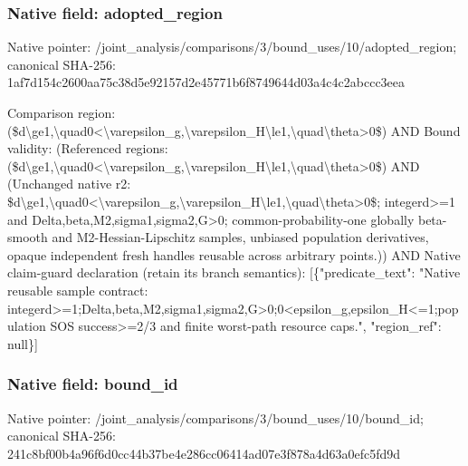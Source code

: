 \documentclass[10pt,a4paper]{article}
\begin{document}
\subsubsection{Native field: adopted\_\allowbreak{}region}
Native pointer: /joint\_\allowbreak{}analysis/comparisons/3/bound\_\allowbreak{}uses/10/adopted\_\allowbreak{}region; canonical SHA-256: 1af7d154c2600aa75c38d5e92157d2e45771b6f8749644d03a4c4c2abccc3eea

\begingroup\raggedright\sloppy Comparison region:\allowbreak{} (\$d\textbackslash{}ge1,\allowbreak{}\textbackslash{}quad0<\textbackslash{}varepsilon\_\allowbreak{}g,\allowbreak{}\textbackslash{}varepsilon\_\allowbreak{}H\textbackslash{}le1,\allowbreak{}\textbackslash{}quad\textbackslash{}theta>0\$) AND Bound validity:\allowbreak{} (Referenced regions:\allowbreak{} (\$d\textbackslash{}ge1,\allowbreak{}\textbackslash{}quad0<\textbackslash{}varepsilon\_\allowbreak{}g,\allowbreak{}\textbackslash{}varepsilon\_\allowbreak{}H\textbackslash{}le1,\allowbreak{}\textbackslash{}quad\textbackslash{}theta>0\$) AND (Unchanged native r2:\allowbreak{} \$d\textbackslash{}ge1,\allowbreak{}\textbackslash{}quad0<\textbackslash{}varepsilon\_\allowbreak{}g,\allowbreak{}\textbackslash{}varepsilon\_\allowbreak{}H\textbackslash{}le1,\allowbreak{}\textbackslash{}quad\textbackslash{}theta>0\$;\allowbreak{} integerd>=\allowbreak{}1 and Delta,\allowbreak{}beta,\allowbreak{}M2,\allowbreak{}sigma1,\allowbreak{}sigma2,\allowbreak{}G>0;\allowbreak{} common-probability-one globally beta-smooth and M2-Hessian-Lipschitz samples,\allowbreak{} unbiased population derivatives,\allowbreak{} opaque independent fresh handles reusable across arbitrary points.)) AND Native claim-guard declaration (retain its branch semantics):\allowbreak{} [\{"predicate\_\allowbreak{}text":\allowbreak{} "Native reusable sample contract:\allowbreak{} integerd>=\allowbreak{}1;\allowbreak{}Delta,\allowbreak{}beta,\allowbreak{}M2,\allowbreak{}sigma1,\allowbreak{}sigma2,\allowbreak{}G>0;\allowbreak{}0<epsilon\_\allowbreak{}g,\allowbreak{}epsilon\_\allowbreak{}H<=\allowbreak{}1;\allowbreak{}population SOS success>=\allowbreak{}2/\allowbreak{}3 and finite worst-path resource caps.",\allowbreak{} "region\_\allowbreak{}ref":\allowbreak{} null\}]\par\endgroup

\subsubsection{Native field: bound\_\allowbreak{}id}
Native pointer: /joint\_\allowbreak{}analysis/comparisons/3/bound\_\allowbreak{}uses/10/bound\_\allowbreak{}id; canonical SHA-256: 241c8bf00b4a96f6d0cc44b37be4e286cc06414ad07e3f878a4d63a0efc5fd9d
\end{document}
